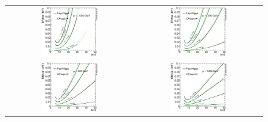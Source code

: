 \begin{figure}[ht]
  \centering
\begin{tabular}{cc}
  \includegraphics[width=0.46\textwidth]{YRHXS_MSSM_charged/YRHXS_MSSM_charged_fig1a.eps} &
  \includegraphics[width=0.46\textwidth]{YRHXS_MSSM_charged/YRHXS_MSSM_charged_fig1b.eps} \\
  \includegraphics[width=0.46\textwidth]{YRHXS_MSSM_charged/YRHXS_MSSM_charged_fig1c.eps} &
  \includegraphics[width=0.46\textwidth]{YRHXS_MSSM_charged/YRHXS_MSSM_charged_fig1d.eps} \\  

\end{tabular}
\end{figure}
